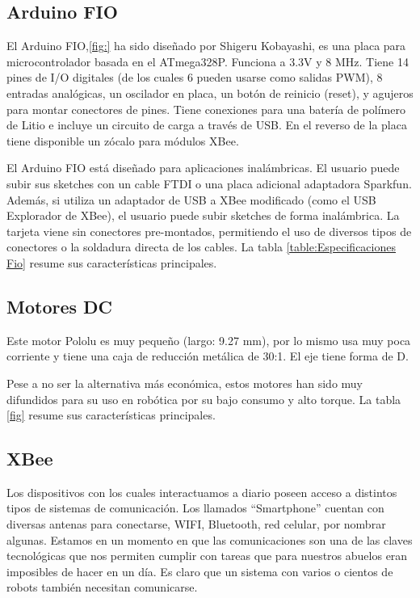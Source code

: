 \subsection{Arduino FIO}
El Arduino FIO,\ref{fig:} ha sido diseñado por Shigeru Kobayashi, es una placa para microcontrolador basada en el ATmega328P. Funciona a 3.3V y 8 MHz. Tiene 14 pines de I/O digitales (de los cuales 6 pueden usarse como salidas PWM), 8 entradas analógicas, un oscilador en placa, un botón de reinicio (reset), y agujeros para montar conectores de pines. Tiene conexiones para una batería de polímero de Litio e incluye un circuito de carga a través de USB. En el reverso de la placa tiene disponible un zócalo para módulos XBee.

El Arduino FIO está diseñado para aplicaciones inalámbricas. El usuario puede subir sus sketches con un cable FTDI o una placa adicional adaptadora Sparkfun. Además, si utiliza un adaptador de USB a XBee modificado (como el USB Explorador de XBee), el usuario puede subir sketches de forma inalámbrica. La tarjeta viene sin conectores pre-montados, permitiendo el uso de diversos tipos de conectores o la soldadura directa de los cables. La tabla \ref{table:Especificaciones Fio} resume sus características principales.

\subsection{Motores DC}
Este motor Pololu es muy pequeño (largo: 9.27 mm), por lo mismo usa muy poca corriente y tiene una caja de reducción metálica de 30:1. El eje tiene forma de D.

Pese a no ser la alternativa más económica, estos motores han sido muy difundidos para su uso en robótica por su bajo consumo y alto torque. La tabla \ref{fig} resume sus características principales.

\subsection{XBee}

Los dispositivos con los cuales interactuamos a diario poseen acceso a distintos tipos de sistemas de comunicación. Los llamados “Smartphone” cuentan con diversas antenas para conectarse, WIFI, Bluetooth, red celular,  por nombrar algunas. Estamos en un momento en que las comunicaciones son una de las claves tecnológicas que nos permiten cumplir con tareas que para nuestros abuelos eran imposibles de hacer en un día. Es claro que un sistema con varios o cientos de robots también necesitan comunicarse. 

